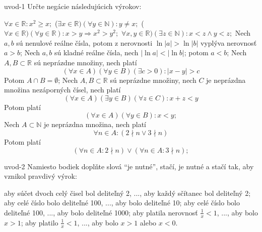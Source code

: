 \begin{defproblem}{uvod-1}
Určte negácie následujúcich výrokov:
\begin{tasks}
  \task $\forall x \in \mathbb{R} : x^2 \geq x;$
  \task ($\exists x \in \mathbb{R})(\forall y \in \mathbb{N}): y \neq x;$
  \task ($\forall x \in \mathbb{R})(\forall y \in \mathbb{R}):
        x > y \Rightarrow x^2 > y^2;$
  \task $\forall x, y \in \mathbb{R})(\exists z \in \mathbb{N}): x < z \land
        y < z;$
  \task Nech $a, b$ sú nenulové reálne čísla, potom z nerovnosti
        $\ln|a| > \ln|b|$
        vyplýva nerovnosť $a > b$;
  \task Nech $a, b$ sú kladné reálne čísla, nech $|\ln a| < |\ln b|$; potom
        $a < b$;
  \task Nech $A, B \subset \mathbb{R}$ sú neprázdne množiny, nech platí
        $$(\forall x \in A)(\forall y \in B)(\exists c > 0): |x - y| > c$$
        Potom $A \cap B = \emptyset$;
  \task Nech $A, B \subset \mathbb{R}$ sú neprázdne množiny, nech $C$ je
        neprázdna množina nezáporných čísel, nech platí
        $$(\forall x \in A)(\exists y \in B)(\forall z \in C): x + z < y$$
        Potom platí
        $$(\forall x \in A)(\forall y \in B): x < y;$$
  \task Nech $A \subset \mathbb{N}$ je neprázdna množina, nech platí
        $$\forall n \in A: (2 \nmid n \lor 3 \nmid n)$$
        Potom platí
        $$(\forall n \in A: 2 \nmid n) \lor (\forall n \in A: 3 \nmid n);$$
\end{tasks}
\end{defproblem}

\begin{defproblem}{uvod-2}
Namiesto bodiek doplňte slová ``je nutné'', stačí, je nutné a stačí tak,
aby vznikol pravdivý výrok:
\begin{tasks}
  \task aby súčet dvoch celý čisel bol deliteľný 2, ..., aby každý sčítanec bol deliteľný 2;
  \task aby celé číslo bolo deliteľné 100, ..., aby bolo deliteľné 10;
  \task aby celé číslo bolo deliteľné 100, ..., aby bolo deliteľné 1000;
  \task aby platila nerovnosť $\frac{1}{x} < 1$, ..., aby bolo $x > 1$;
  \task aby platilo $\frac{1}{x} < 1$, ..., aby bolo $x > 1$ alebo $x < 0$.
\end{tasks}
\end{defproblem}
